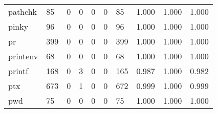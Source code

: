 \begin{longtable}{lp{1.3cm}p{1.3cm}p{1.3cm}p{1.3cm}p{1.3cm}p{1.3cm}p{1.3cm}p{1.3cm}p{1.3cm}}
pathchk   &                     85 &                                             0 &                                            0 &                                           0 &                                            0 &                                         85 &                                1.000 &                                  1.000 &                                1.000 \\
pinky     &                     96 &                                             0 &                                            0 &                                           0 &                                            0 &                                         96 &                                1.000 &                                  1.000 &                                1.000 \\
pr        &                    399 &                                             0 &                                            0 &                                           0 &                                            0 &                                        399 &                                1.000 &                                  1.000 &                                1.000 \\
printenv  &                     68 &                                             0 &                                            0 &                                           0 &                                            0 &                                         68 &                                1.000 &                                  1.000 &                                1.000 \\
printf    &                    168 &                                             0 &                                            3 &                                           0 &                                            0 &                                        165 &                                0.987 &                                  1.000 &                                0.982 \\
ptx       &                    673 &                                             0 &                                            1 &                                           0 &                                            0 &                                        672 &                                0.999 &                                  1.000 &                                0.999 \\
pwd       &                     75 &                                             0 &                                            0 &                                           0 &                                            0 &                                         75 &                                1.000 &                                  1.000 &                                1.000 \\

\end{longtable}
